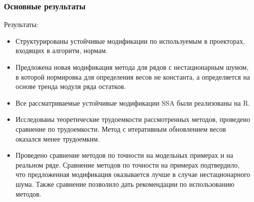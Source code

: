 \documentclass[10pt, ucs, notheorems, handout]{beamer}
\begin{document}
\begin{frame}
\frametitle{Основные результаты}
\small
Результаты:
\begin{itemize}
	\item Структурированы устойчивые модификации по используемым в проекторах, входящих в алгоритм, нормам.
	\item Предложена новая модификация метода для рядов с нестационарным шумом, в которой нормировка для определения весов не константа, а определяется на основе тренда модуля ряда остатков.
	\item Все рассматриваемые устойчивые модификации SSA были реализованы на R.
	\item Исследованы теоретические трудоемкости рассмотренных методов, проведено сравнение по трудоемкости. Метод с итеративным обновлением весов оказался менее трудоемким.
	\item Проведено сравнение методов по точности на модельных примерах и на реальном ряде. Сравнение методов по точности на примерах подтвердило, что предложенная модификация оказывается лучше в случае нестационарного шума. Также сравнение позволило дать рекомендации по использованию методов.
\end{itemize}

\note{
	
}
\end{frame}
\end{document}

